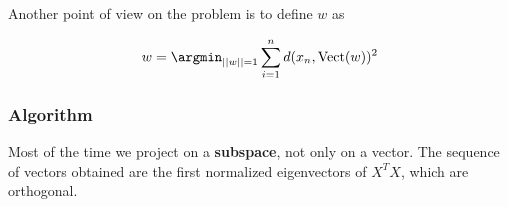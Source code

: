 \documentclass[
10pt, %
a4paper, %
oneside, %
headinclude,footinclude, %
BCOR5mm, %
]{scrartcl}
\begin{document}
Another point of view on the problem is to define $w$ as

\begin{equation*}
    w = \argmin_{||w||=1} \sum^{n}_{i=1} d(x_n, \text{Vect}(w))^2
\end{equation*}

\subsubsection{\large\color{Periwinkle}Algorithm}

Most of the time we project on a \textbf{{subspace}}, not only on a vector. The sequence of vectors obtained are the first normalized eigenvectors of $X^TX$, which are orthogonal.

%
%
%
%
%
%
%
%
%
%
%
%
\end{document}
